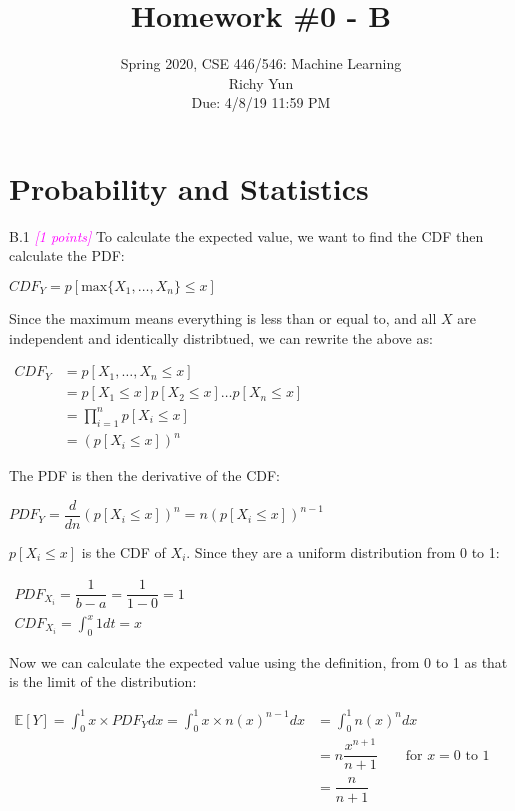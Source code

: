 \documentclass{article}
\date{{}}
\newcommand{\1}{\mathbf{1}}
\newcommand{\E}{\mathbb{E}}
\newcommand{\points}[1]{\small\textcolor{magenta}{\emph{[#1 points]}} \normalsize}
\begin{document}
\title{Homework \#0 - B}
\author{\normalsize{Spring 2020, CSE 446/546: Machine Learning}\\
\normalsize{Richy Yun} \\
\normalsize{Due: 4/8/19  11:59 PM}}
\maketitle


\section*{Probability and Statistics}
B.1  \points{1} To calculate the expected value, we want to find the CDF then calculate the PDF:
\begin{center}
	$CDF_Y=p[\text{max}\{X_1,\dots,X_n\}\leq x]$
\end{center}
Since the maximum means everything is less than or equal to, and all $X$ are independent and identically distribtued, we can rewrite the above as:
\begin{center}
		$\begin{aligned}
	CDF_Y&=p[X_1,\dots,X_n \leq x]\\
	&=p[X_1\leq x]p[X_2\leq x]\dots p[X_n\leq x]\\
	&=\prod_{i=1}^{n}p[X_i\leq x]\\
	&=(p[X_i\leq x])^n
	\end{aligned}$
\end{center}
The PDF is then the derivative of the CDF:
\begin{center}
	$PDF_Y=\dfrac{d}{dn}(p[X_i\leq x])^n=n(p[X_i\leq x])^{n-1}$
\end{center}

$p[X_i\leq x]$ is the CDF of $X_i$. Since they are a uniform distribution from 0 to 1:
\begin{center}
	$\begin{aligned} PDF_{X_i}=\dfrac{1}{b-a}=\dfrac{1}{1-0}=1\\
	CDF_{X_i}=\int_{0}^{x}1dt=x \end{aligned}$
\end{center}
Now we can calculate the expected value using the definition, from 0 to 1 as that is the limit of the distribution:
\begin{center}
	$\begin{aligned} 
	\E[Y]=\int_{0}^{1}x\times PDF_Ydx=\int_{0}^{1}x\times n(x)^{n-1}dx&=\int_{0}^{1}n(x)^ndx\\
	&=n\dfrac{x^{n+1}}{n+1} \qquad \text{for } x=0 \text{ to } 1\\
	&=\dfrac{n}{n+1}
	\end{aligned}$
\end{center}
\end{document}
